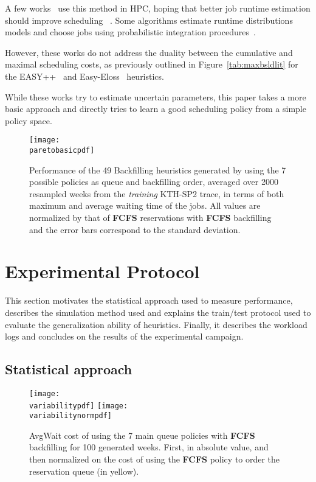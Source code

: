 A few works~\cite{Tsafrir_easypp_2005,learningruntimes} use this method in HPC,
hoping that better job runtime estimation should improve scheduling
~\cite{chiang_impact_2002}. Some algorithms estimate runtime
distributions models and choose jobs using probabilistic integration
procedures~\cite{Nissimov2008}.

However, these works do not address the duality between the cumulative and
maximal scheduling costs, as previously outlined in Figure~\ref{tab:maxbsldlit} for
the EASY++~\cite{Tsafrir_easypp_2005} and Easy-Eloss~\cite{learningruntimes}
heuristics.

While these works try to estimate uncertain parameters, this paper takes a more
basic approach and directly tries to learn a good scheduling policy from a
simple policy space.

\begin{figure*}[ht!]
  \centering
  \texttt{[image: \\paretobasicpdf]}

  \caption{Performance of the 49 Backfilling heuristics generated by using the
    7 possible policies as queue and backfilling order, averaged over 2000
    resampled weeks from the \textit{training} KTH-SP2 trace, in terms of both
    maximum and average waiting time of the jobs. All values are normalized by
  that of \textbf{FCFS} reservations with \textbf{FCFS} backfilling and the
error bars correspond to the standard deviation.}

  \label{fig:paretobasic}
\end{figure*}

\section{Experimental Protocol}
\label{sec:expe}

This section motivates the statistical approach used to measure performance,
describes the simulation method used and explains the train/test protocol used
to evaluate the generalization ability of heuristics. Finally, it describes the
workload logs and concludes on the results of the experimental campaign.

\subsection{Statistical approach}
\label{sub:sa}

\begin{figure*}[ht!]
  \centering
  \texttt{[image: \\variabilitypdf]}
  \texttt{[image: \\variabilitynormpdf]}

  \caption{AvgWait cost of using the 7 main queue policies with \textbf{FCFS}
    backfilling for 100 generated weeks. First, in absolute value, and then
    normalized on the cost of using the \textbf{FCFS} policy to order the
  reservation queue (in yellow). }

  \label{fig:variability}
\end{figure*}

